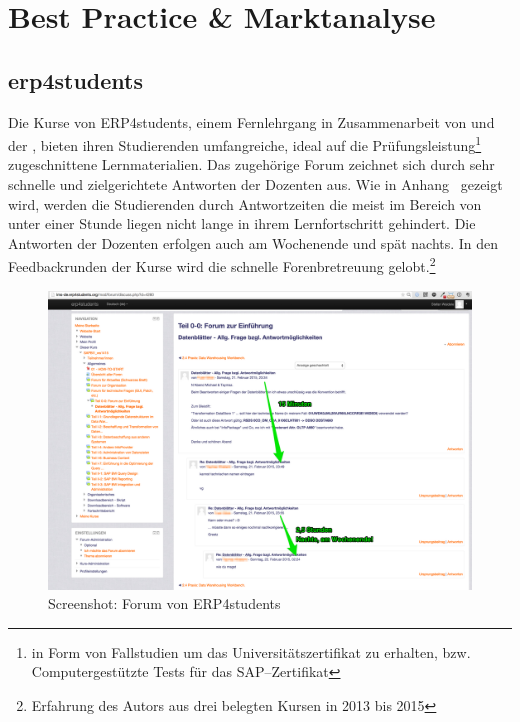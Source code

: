 
\section{Best Practice \& Marktanalyse} %
\label{sec:best_practice}

\subsection{erp4students} %
\label{sub:erp4students}

Die Kurse von ERP4students, einem Fernlehrgang in Zusammenarbeit von  und der , bieten ihren Studierenden umfangreiche, ideal auf die Prüfungsleistung\footnote{in Form von Fallstudien um das Universitätszertifikat zu erhalten, bzw. Computergestützte Tests für das SAP–Zertifikat} zugeschnittene Lernmaterialien. Das zugehörige Forum zeichnet sich durch sehr schnelle und zielgerichtete Antworten der Dozenten aus. Wie in Anhang~ gezeigt wird, werden die Studierenden durch Antwortzeiten die meist im Bereich von unter einer Stunde liegen nicht lange in ihrem Lernfortschritt gehindert. Die Antworten der Dozenten erfolgen auch am Wochenende und spät nachts. In den Feedbackrunden der Kurse wird die schnelle Forenbretreuung gelobt.\footnote{Erfahrung des Autors aus drei belegten Kursen in 2013 bis 2015}

\begin{figure}[p]
\begin{center}
\includegraphics[width=\textwidth]{erp4students.jpg}
\caption{Screenshot: Forum von ERP4students}
\label{fig:erp4s}
\end{center}
\end{figure}

